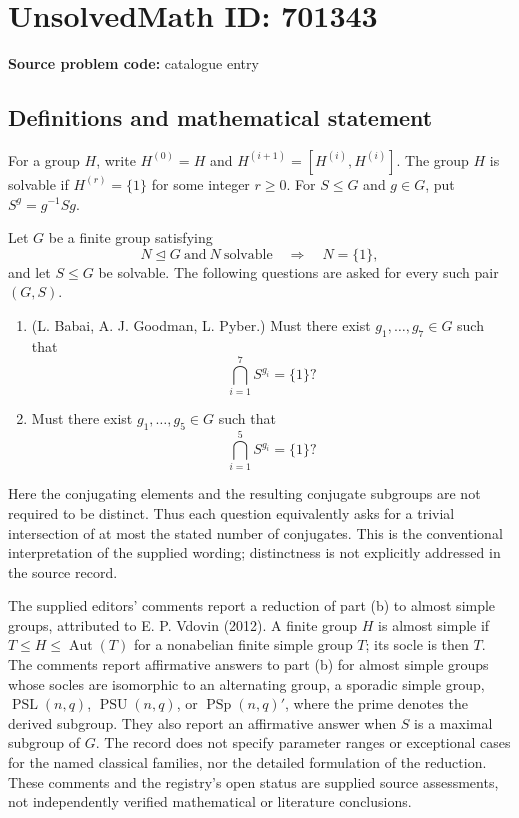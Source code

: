 \documentclass[11pt]{article}
\begin{document}
\section*{UnsolvedMath ID: 701343}
\textbf{Source problem code:} catalogue entry
\subsection{Definitions and mathematical statement}
For a group \(H\), write \(H^{(0)}=H\) and \(H^{(i+1)}=[H^{(i)},H^{(i)}]\). The group \(H\) is solvable if \(H^{(r)}=\{1\}\) for some integer \(r\geq 0\). For \(S\leq G\) and \(g\in G\), put \(S^g=g^{-1}Sg\).

Let \(G\) be a finite group satisfying
\[
N\trianglelefteq G\ \text{and}\ N\ \text{solvable}\quad\Longrightarrow\quad N=\{1\},
\]
and let \(S\leq G\) be solvable. The following questions are asked for every such pair \((G,S)\).
\begin{enumerate}
\item[(a)] (L. Babai, A. J. Goodman, L. Pyber.) Must there exist \(g_1,\ldots,g_7\in G\) such that
\[
\bigcap_{i=1}^{7}S^{g_i}=\{1\}?
\]
\item[(b)] Must there exist \(g_1,\ldots,g_5\in G\) such that
\[
\bigcap_{i=1}^{5}S^{g_i}=\{1\}?
\]
\end{enumerate}
Here the conjugating elements and the resulting conjugate subgroups are not required to be distinct. Thus each question equivalently asks for a trivial intersection of at most the stated number of conjugates. This is the conventional interpretation of the supplied wording; distinctness is not explicitly addressed in the source record.

The supplied editors' comments report a reduction of part (b) to almost simple groups, attributed to E. P. Vdovin (2012). A finite group \(H\) is almost simple if \(T\leq H\leq\operatorname{Aut}(T)\) for a nonabelian finite simple group \(T\); its socle is then \(T\). The comments report affirmative answers to part (b) for almost simple groups whose socles are isomorphic to an alternating group, a sporadic simple group, \(\operatorname{PSL}(n,q)\), \(\operatorname{PSU}(n,q)\), or \(\operatorname{PSp}(n,q)'\), where the prime denotes the derived subgroup. They also report an affirmative answer when \(S\) is a maximal subgroup of \(G\). The record does not specify parameter ranges or exceptional cases for the named classical families, nor the detailed formulation of the reduction. These comments and the registry's open status are supplied source assessments, not independently verified mathematical or literature conclusions.
\end{document}
